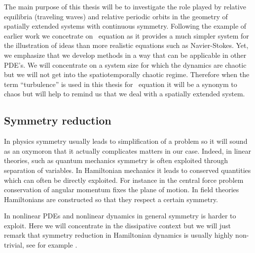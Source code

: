 The main purpose of this thesis will be to investigate the role played by relative equilibria (traveling waves) 
and relative periodic orbits in the geometry of spatially extended systems with continuous symmetry. Following
the example of earlier work we concetrate on \KS\ equation as it provides a much simpler system for the illustration
of ideas than more realistic equations such as Navier-Stokes. Yet, we emphasize that we develop methods in
a way that can be applicable in other PDE's. We will concentrate on a system size for which the dynamics
are chaotic but we will not get into the spatiotemporally chaotic regime. Therefore when the term ``turbulence'' is
used in this thesis for \KS\ equation it will be a synonym to chaos but will help  
to remind us that we deal with a spatially extended system. 

\subsection{Symmetry reduction}

In physics symmetry usually leads to simplification of a problem so it will sound as an oxymoron that it actually
complicates matters in our case. Indeed, in linear theories, such as quantum mechanics symmetry is often exploited
through separation of variables. In Hamiltonian mechanics it leads to conserved quantities which can often be
directly exploited. For instance in the central force problem conservation of angular momentum fixes the plane
of motion. In field theories Hamiltonians are constructed so that they respect a certain symmetry.

In nonlinear PDEs and nonlinear dynamics in general symmetry is harder to exploit. Here we will concentrate
in the dissipative context but we will just remark that symmetry reduction in Hamiltonian dynamics is usually highly
non-trivial, see for example .




